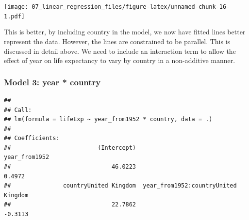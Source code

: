 \documentclass[12pt,]{krantz}
\makeatletter
\newenvironment{Shaded}{\begin{snugshade}}{\end{snugshade}}
\newcommand{\DataTypeTok}[1]{\textcolor[rgb]{0.13,0.29,0.53}{#1}}
\newcommand{\KeywordTok}[1]{\textcolor[rgb]{0.13,0.29,0.53}{\textbf{#1}}}
\newcommand{\NormalTok}[1]{#1}
\newcommand{\OperatorTok}[1]{\textcolor[rgb]{0.81,0.36,0.00}{\textbf{#1}}}
\newcommand{\StringTok}[1]{\textcolor[rgb]{0.31,0.60,0.02}{#1}}
\newenvironment{kframe}{%
\medskip{}
\setlength{\fboxsep}{.8em}
 \def\at@end@of@kframe{}%
 \ifinner\ifhmode%
  \def\at@end@of@kframe{\end{minipage}}%
  \begin{minipage}{\columnwidth}%
 \fi\fi%
 \def\FrameCommand##1{\hskip\@totalleftmargin \hskip-\fboxsep
 \colorbox{shadecolor}{##1}\hskip-\fboxsep
     \hskip-\linewidth \hskip-\@totalleftmargin \hskip\columnwidth}%
 \MakeFramed {\advance\hsize-\width
   \@totalleftmargin\z@ \linewidth\hsize
   \@setminipage}}%
 {\par\unskip\endMakeFramed%
 \at@end@of@kframe}
\renewenvironment{Shaded}{\begin{kframe}}{\end{kframe}}
\theoremstyle{definition}
\theoremstyle{definition}
\theoremstyle{definition}
\theoremstyle{remark}
\makeatother
\begin{document}
\texttt{[image: 07\_linear\_regression\_files/figure-latex/unnamed-chunk-16-1.pdf]}

This is better, by including country in the model, we now have fitted
lines better represent the data. However, the lines are constrained to
be parallel. This is discussed in detail above. We need to include an
interaction term to allow the effect of year on life expectancy to vary
by country in a non-additive manner.

\hypertarget{model-3-year-country}{%
\subsubsection{Model 3: year * country}\label{model-3-year-country}}

\begin{Shaded}
\end{Shaded}

\begin{verbatim}
## 
## Call:
## lm(formula = lifeExp ~ year_from1952 * country, data = .)
## 
## Coefficients:
##                         (Intercept)                        year_from1952  
##                             46.0223                               0.4972  
##               countryUnited Kingdom  year_from1952:countryUnited Kingdom  
##                             22.7862                              -0.3113
\end{verbatim}

\begin{Shaded}
\end{Shaded}
\end{document}
